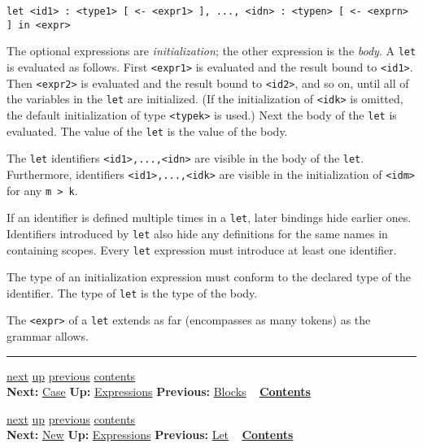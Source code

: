 \documentclass[]{article}
\begin{document}
\begin{verbatim}
let <id1> : <type1> [ <- <expr1> ], ..., <idn> : <typen> [ <- <exprn> ] in <expr>
\end{verbatim}

The optional expressions are \emph{initialization}; the other expression
is the \emph{body}. A \texttt{let} is evaluated as follows. First
\texttt{\textless{}expr1\textgreater{}} is evaluated and the result
bound to \texttt{\textless{}id1\textgreater{}}. Then
\texttt{\textless{}expr2\textgreater{}} is evaluated and the result
bound to \texttt{\textless{}id2\textgreater{}}, and so on, until all of
the variables in the \texttt{let} are initialized. (If the
initialization of \texttt{\textless{}idk\textgreater{}} is omitted, the
default initialization of type \texttt{\textless{}typek\textgreater{}}
is used.) Next the body of the \texttt{let} is evaluated. The value of
the \texttt{let} is the value of the body.

The \texttt{let} identifiers
\texttt{\textless{}id1\textgreater{},...,\textless{}idn\textgreater{}}
are visible in the body of the \texttt{let}. Furthermore, identifiers
\texttt{\textless{}id1\textgreater{},...,\textless{}idk\textgreater{}}
are visible in the initialization of
\texttt{\textless{}idm\textgreater{}} for any
\texttt{m \textgreater{} k}.

If an identifier is defined multiple times in a \texttt{let}, later
bindings hide earlier ones. Identifiers introduced by \texttt{let} also
hide any definitions for the same names in containing scopes. Every
\texttt{let} expression must introduce at least one identifier.

The type of an initialization expression must conform to the declared
type of the identifier. The type of \texttt{let} is the type of the
body.

The \texttt{\textless{}expr\textgreater{}} of a \texttt{let} extends as
far (encompasses as many tokens) as the grammar allows.

\begin{center}\rule{3in}{0.4pt}\end{center}

\href{node22.html}{next} \href{node13.html}{up}
\href{node20.html}{previous} \href{node1.html}{contents} \\
\textbf{Next:} \href{node22.html}{Case} \textbf{Up:}
\href{node13.html}{Expressions} \textbf{Previous:}
\href{node20.html}{Blocks} ~ \textbf{\href{node1.html}{Contents}}

\href{node23.html}{next} \href{node13.html}{up}
\href{node21.html}{previous} \href{node1.html}{contents} \\
\textbf{Next:} \href{node23.html}{New} \textbf{Up:}
\href{node13.html}{Expressions} \textbf{Previous:}
\href{node21.html}{Let} ~ \textbf{\href{node1.html}{Contents}} \\ \\
\end{document}
